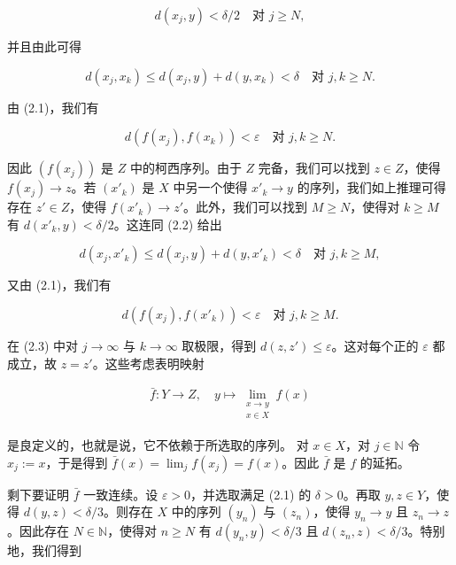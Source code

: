 \begin{theorem}
\begin{subitems}
\begin{equation}
d(x_j, y) < \delta/2 \quad \text{对 } j \ge N,\tag{2.2}
\end{equation}

并且由此可得

\[
d(x_j, x_k) \le d(x_j, y) + d(y, x_k) < \delta \quad \text{对 } j, k \ge N.
\]

由 (2.1)，我们有

\[
d(f(x_j), f(x_k)) < \varepsilon \quad \text{对 } j, k \ge N.
\]

因此 $ (f(x_j)) $ 是 $ Z $ 中的柯西序列。由于 $ Z $ 完备，我们可以找到 $ z \in Z $，使得 $ f(x_j) \to z $。若 $ (x'_k) $ 是 $ X $ 中另一个使得 $ x'_k \to y $ 的序列，我们如上推理可得存在 $ z' \in Z $，使得 $ f(x'_k) \to z' $。此外，我们可以找到 $ M \ge N $，使得对 $ k \ge M $ 有 $ d(x'_k, y) < \delta/2 $。这连同 (2.2) 给出

\[
d(x_j, x'_k) \le d(x_j, y) + d(y, x'_k) < \delta \quad \text{对 } j, k \ge M,
\]

又由 (2.1)，我们有

\begin{equation}
d(f(x_j), f(x'_k)) < \varepsilon \quad \text{对 } j, k \ge M.\tag{2.3}
\end{equation}

在 (2.3) 中对 $ j \to \infty $ 与 $ k \to \infty $ 取极限，得到 $ d(z, z') \le \varepsilon $。这对每个正的 $ \varepsilon $ 都成立，故 $ z = z' $。这些考虑表明映射

\begin{equation*}
\begin{aligned}
\bar{f} : Y \to Z, \quad y \mapsto \lim_{\substack{x \to y \\ x \in X}} f(x)
\end{aligned}
\end{equation*}

是良定义的，也就是说，它不依赖于所选取的序列。
对 $ x \in X $，对 $ j \in \mathbb{N} $ 令 $ x_j := x $，于是得到 $ \bar{f}(x) = \lim_j f(x_j) = f(x) $。因此 $ \bar{f} $ 是 $ f $ 的延拓。

\item

剩下要证明 $ \bar{f} $ 一致连续。设 $ \varepsilon > 0 $，并选取满足 (2.1) 的 $ \delta > 0 $。再取 $ y, z \in Y $，使得 $ d(y, z) < \delta/3 $。则存在 $ X $ 中的序列 $ (y_n) $ 与 $ (z_n) $，使得 $ y_n \to y $ 且 $ z_n \to z $。因此存在 $ N \in \mathbb{N} $，使得对 $ n \ge N $ 有 $ d(y_n, y) < \delta/3 $ 且 $ d(z_n, z) < \delta/3 $。特别地，我们得到


\end{subitems}
\end{theorem}
